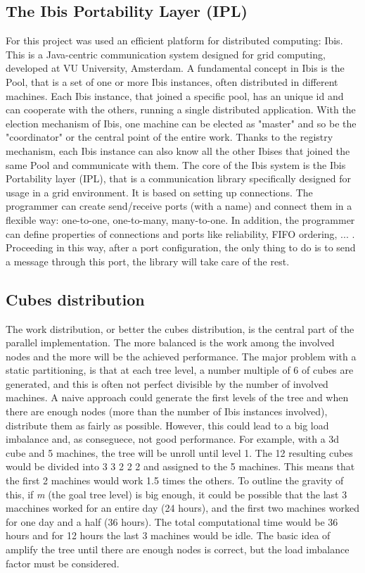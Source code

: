\documentclass[a4paper]{article}
\begin{document}
\subsection{The Ibis Portability Layer (IPL)}
\label{sec:ibis}
For this project was used an efficient platform for distributed computing: Ibis. This is a Java-centric communication system designed for grid computing, developed at VU University, Amsterdam. A fundamental concept in Ibis is the Pool, that is a set of one or more Ibis instances, often distributed in different machines. Each Ibis instance, that joined a specific pool, has an unique id and can cooperate with the others, running a single distributed application. With the election mechanism of Ibis, one machine can be elected as "master" and so be the "coordinator" or the central point of the entire work. Thanks to the registry mechanism, each Ibis instance can also know all the other Ibises that joined the same Pool and communicate with them. The core of the Ibis system is the  Ibis Portability layer (IPL), that is a communication library specifically designed for usage in a grid environment. It is based on setting up connections. The programmer can create send/receive ports (with a name) and connect them in a flexible way: one-to-one, one-to-many, many-to-one. In addition, the programmer can define properties of connections and ports like reliability, FIFO ordering, ... . Proceeding in this way, after a port configuration, the only thing to do is to send a message through this port, the library will take care of the rest. 

\subsection{Cubes distribution}
\label{sec:cubes_distr}
The work distribution, or better the cubes distribution, is the central part of the parallel implementation. The more balanced is the work among the involved nodes and the more will be the achieved performance. The major problem with a static partitioning, is that at each tree level, a number multiple of 6 of cubes are generated, and this is often not perfect divisible by the number of involved machines. A naive approach could generate the first levels of the tree and when there are enough nodes (more than the number of Ibis instances involved), distribute them as fairly as possible. However, this could lead to a big load imbalance and, as conseguece, not good performance. For example, with a 3d cube and 5 machines, the tree will be unroll until level 1. The 12 resulting cubes would be divided into 3 3 2 2 2 and assigned to the 5 machines. This means that the first 2 machines would work 1.5 times the others. To outline the gravity of this, if \textit{m} (the goal tree level) is big enough, it could be possible that the last 3 macchines worked for an entire day (24 hours), and the first two machines worked for one day and a half (36 hours). The total computational time would be 36 hours and for 12 hours the last 3 machines would be idle. 
The basic idea of amplify the tree until there are enough nodes is correct, but the load imbalance factor must be considered. 
\end{document}
